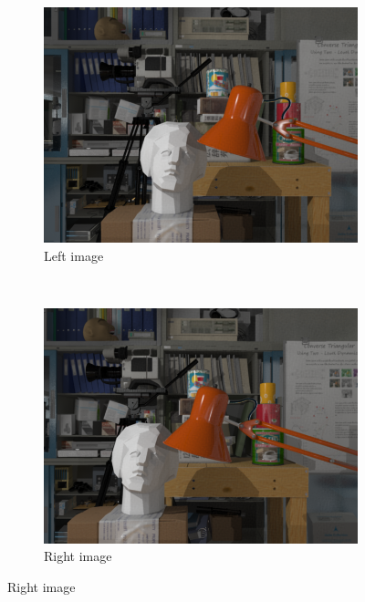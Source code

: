 \begin{figure}[h!]
\centering
\begin{subfigure}[]{0.4\textwidth}
\centering
\includegraphics[width=1\textwidth]{./img/left_watermarked.png}
\caption{\small{Left image}}
\label{fig:vs1}
\end{subfigure}%
~ \quad
\begin{subfigure}[]{0.4\textwidth}
\centering
\includegraphics[width= 1\textwidth]{./img/right_watermarked.png}
\caption{\small{Right image}}
\label{fig:vs2}
  \end{subfigure}
 

\end{figure}
